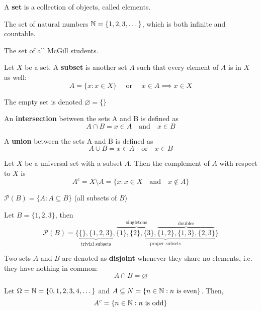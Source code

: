 \documentclass{article}
\begin{document}
	\begin{defn}
		A \textbf{set} is a collection of objects, called elements.
	\end{defn}
	\begin{exmp}
		The set of natural numbers $\mathbb{N} = \{ 1, 2, 3, \dots\}$, which is both infinite and countable.
	\end{exmp}
	\begin{exmp}
		The set of all McGill students.
	\end{exmp}
	\begin{defn}
		Let $X$ be a set. A \textbf{subset} is another set $A$ such that every element of $A$ is in $X$ as well:
		$$ A = \{ x: x \in X\} \quad \text{ or } \quad x \in A \implies x \in X$$
	\end{defn}
	\begin{rem}
		The empty set is denoted $\varnothing = \{\}$
	\end{rem}
	\begin{defn}
		An \textbf{intersection} between the sets A and B is defined as
		$$ A \cap B = x \in A \quad \text{and}\quad x \in B$$
	\end{defn}
	\begin{defn}
		A \textbf{union} between the sets A and B is defined as
		$$ A \cup B = x \in A \quad \text{or}\quad x \in B$$
	\end{defn}
	\begin{defn}
		Let $X$ be a universal set with a subset $A$. Then the complement of $A$ with respect to $X$ is
		$$ A^c = X \setminus A = \{ x: x \in X \quad \text{and} \quad x \notin A \}$$
	\end{defn}
	\begin{exmp}
		$\mathcal{P} (B) = \{ A: A \subseteq B \}$ (all subsets of $B$)
		
		Let $B = \{1,2,3\}$, then
		$$ \mathcal{P}(B) = \bigg\{ \underbrace{ \{\}, \{1,2,3\}}_{\text{trivial subsets}}, \underbrace{\overbrace{\{1\}, \{2\}, \{3\},}^{\text{singletons}} \overbrace{\{1,2\}, \{1,3\}, \{2,3\}}^{\text{doubles}}}_{\text{proper subsets}} \bigg\}$$
	\end{exmp}
	\begin{defn}
		Two sets $A$ and $B$ are denoted as \textbf{disjoint} whenever they share no elements, i.e. they have nothing in common:
		$$ A \cap B = \varnothing$$ 
	\end{defn}
	\begin{exmp}
		Let $\Omega = \mathbb{N} = \{ 0,1,2,3,4,\dots\}$ and $A \subseteq N = \{ n \in \mathbb{N}: n \text{ is even}\}$. Then,
		$$ A^c = \{ n \in \mathbb{N} : n \text{ is odd}\}$$
	\end{exmp}
\end{document}
